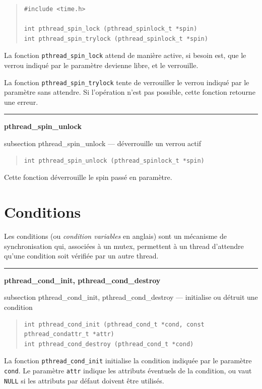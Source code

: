 \documentclass [twoside] {report}
\newcommand {\primitive} [1]
    {
	\phantomsection
	{\large \textbf {#1}}
	\addcontentsline {toc} {subsection} {#1}
    }
\newcommand {\separation}
    {
	\vspace {5mm}
	\nopagebreak
	\hrule
    }
\begin{document}
\begin {quote}
\begin {verbatim}
#include <time.h>

int pthread_spin_lock (pthread_spinlock_t *spin)
int pthread_spin_trylock (pthread_spinlock_t *spin)
\end{verbatim}
\end {quote}

La fonction \verb|pthread_spin_lock| attend de manière active, si
besoin est, que le verrou indiqué par le paramètre devienne libre,
et le verrouille.

La fonction \verb|pthread_spin_trylock| tente de verrouiller le verrou
indiqué par le paramètre sans attendre. Si l'opération n'est pas
possible, cette fonction retourne une erreur.



\separation
\primitive {pthread\_spin\_unlock} --- déverrouille un verrou actif

\begin {quote}
\begin {verbatim}
int pthread_spin_unlock (pthread_spinlock_t *spin)
\end{verbatim}
\end {quote}

Cette fonction déverrouille le spin passé en paramètre.


\section {Conditions}

Les conditions (ou \textit {condition variables} en anglais) sont un
mécanisme de synchronisation qui, associées à un mutex, permettent à
un thread d'attendre qu'une condition soit vérifiée par un autre thread.


\separation
\primitive {pthread\_cond\_init, pthread\_cond\_destroy} --- initialise ou détruit une condition

\begin {quote}
\begin {verbatim}
int pthread_cond_init (pthread_cond_t *cond, const pthread_condattr_t *attr)
int pthread_cond_destroy (pthread_cond_t *cond)
\end{verbatim}
\end {quote}

La fonction \verb|pthread_cond_init| initialise la condition indiquée
par le paramètre \texttt {cond}.  Le paramètre \texttt {attr} indique
les attributs éventuels de la condition, ou vaut \texttt {NULL} si les
attributs par défaut doivent être utilisés.
\end{document}
